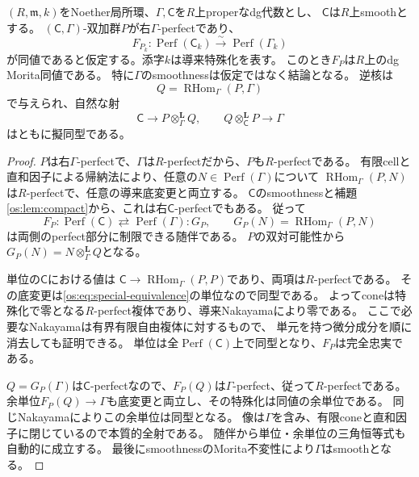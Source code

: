 \begin{theorem}[片側核の特殊ファイバー判定]\label{os:thm:local}
$(R,\mathfrak m,k)$をNoether局所環、$\Gamma,\mathsf C$を$R$上properなdg代数とし、
$\mathsf C$は$R$上smoothとする。
$(\mathsf C,\Gamma)$-双加群$P$が右$\Gamma$-perfectであり、
\[
 F_{P_k}:\operatorname{Perf}(\mathsf C_k)
       \xrightarrow{\sim}\operatorname{Perf}(\Gamma_k)
 \tag{OS2}\label{os:eq:special-equivalence}
\]
が同値であると仮定する。添字$k$は導来特殊化を表す。
このとき$F_P$は$R$上のdg Morita同値である。
特に$\Gamma$のsmoothnessは仮定ではなく結論となる。
逆核は
\[
 Q=\operatorname{RHom}_{\Gamma}(P,\Gamma)
 \tag{OS3}\label{os:eq:inverse}
\]
で与えられ、自然な射
\[
 \mathsf C\longrightarrow P\otimes_\Gamma^{\mathbf L}Q,
 \qquad Q\otimes_{\mathsf C}^{\mathbf L}P\longrightarrow\Gamma
 \tag{OS4}\label{os:eq:unit-counit}
\]
はともに擬同型である。
\end{theorem}
\begin{proof}
$P$は右$\Gamma$-perfectで、$\Gamma$は$R$-perfectだから、$P$も$R$-perfectである。
有限cellと直和因子による帰納法により、任意の$N\in\operatorname{Perf}(\Gamma)$について
$\operatorname{RHom}_{\Gamma}(P,N)$は$R$-perfectで、任意の導来底変更と両立する。
$\mathsf C$のsmoothnessと補題\ref{os:lem:compact}から、これは右$\mathsf C$-perfectでもある。
従って
\[
 F_P:\operatorname{Perf}(\mathsf C)\rightleftarrows
 \operatorname{Perf}(\Gamma):G_P,
 \qquad G_P(N)=\operatorname{RHom}_{\Gamma}(P,N)
\]
は両側のperfect部分に制限できる随伴である。
$P$の双対可能性から$G_P(N)=N\otimes_\Gamma^{\mathbf L}Q$となる。

単位の$\mathsf C$における値は
$\mathsf C\to\operatorname{RHom}_\Gamma(P,P)$であり、両項は$R$-perfectである。
その底変更は\eqref{os:eq:special-equivalence}の単位なので同型である。
よってconeは特殊化で零となる$R$-perfect複体であり、導来Nakayamaにより零である。
ここで必要なNakayamaは有界有限自由複体に対するもので、
単元を持つ微分成分を順に消去しても証明できる\cite[Tag~068U]{OSStacksSplit}。
単位は全$\operatorname{Perf}(\mathsf C)$上で同型となり、$F_P$は完全忠実である。

$Q=G_P(\Gamma)$は$\mathsf C$-perfectなので、$F_P(Q)$は$\Gamma$-perfect、従って$R$-perfectである。
余単位$F_P(Q)\to\Gamma$も底変更と両立し、その特殊化は同値の余単位である。
同じNakayamaによりこの余単位は同型となる。
像は$\Gamma$を含み、有限coneと直和因子に閉じているので本質的全射である。
随伴から単位・余単位の三角恒等式も自動的に成立する。
最後にsmoothnessのMorita不変性により$\Gamma$はsmoothとなる。
\end{proof}

